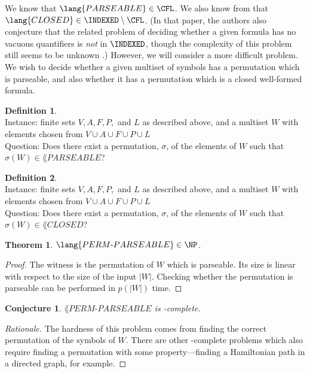 \documentclass[draft]{article}
\newtheorem{theorem}{Theorem}
\newtheorem{conjecture}{Conjecture}
\newenvironment{rationale}{\begin{proof}[Rationale]}{\end{proof}}
\theoremstyle{remark} \newtheorem{technicality}{Technical note}
\theoremstyle{definition} \newtheorem{definition}{Definition}
\newenvironment{langdef}[1]{\begin{definition}{\lang{#1}}}{\end{definition}}
\newenvironment{instance}{\\Instance:}{}
\newenvironment{question}{\\Question:}{}
\newcommand{\pp}{PERM\mbox{-}PARSEABLE}
\newcommand{\pc}{PERM\mbox{-}CLOSED}
\begin{document}
We know that $\lang{PARSEABLE}\in\CFL$.
We also know from \cite{mp84} that $\lang{CLOSED}\in\INDEXED\setminus\CFL$.
(In that paper, the authors also conjecture that the related problem of deciding whether a given formula has no vacuous quantifiers is \emph{not} in $\INDEXED$, though the complexity of this problem still seems to be unknown \cite{potts}.)
However, we will consider a more difficult problem.
We wish to decide whether a given multiset of symbols has a permutation which is parseable, and also whether it has a permutation which is a closed well-formed formula.

\begin{langdef}{\pp}
  \begin{instance}
    finite sets $V, A, F, P,$ and $L$ as described above, and a multiset $W$ with elements chosen from $V\cup A\cup F\cup P\cup L$
  \end{instance}
  \begin{question}
    Does there exist a permutation, $\sigma$, of the elements of $W$ such that $\sigma(W)\in\lang{PARSEABLE}$?
  \end{question}
\end{langdef}

\begin{langdef}{\pc}
  \begin{instance}
    finite sets $V, A, F, P,$ and $L$ as described above, and a multiset $W$ with elements chosen from $V\cup A\cup F\cup P\cup L$
  \end{instance}
  \begin{question}
    Does there exist a permutation, $\sigma$, of the elements of $W$ such that $\sigma(W)\in\lang{CLOSED}$?
  \end{question}
\end{langdef}

\begin{theorem}
  $\lang{\pp}\in\NP$.
\end{theorem}
\begin{proof}
  The witness is the permutation of $W$ which is parseable.
  Its size is linear with respect to the size of the input $|W|$.
  Checking whether the permutation is parseable can be performed in $p(|W|)$ time.
\end{proof}

\begin{conjecture}
  $\lang{\pp}$ is \NP-complete.
\end{conjecture}
\begin{rationale}
  The hardness of this problem comes from finding the correct permutation of the symbols of $W$.
  There are other \NP-complete problems which also require finding a permutation with some property---finding a Hamiltonian path in a directed graph, for example.
\end{rationale}
\end{document}
